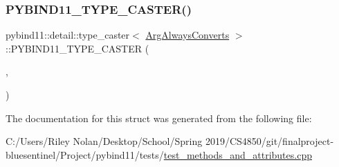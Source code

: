 \subsubsection{\texorpdfstring{PYBIND11\_TYPE\_CASTER()}{PYBIND11\_TYPE\_CASTER()}}
{\footnotesize\ttfamily pybind11\+::detail\+::type\+\_\+caster$<$ \mbox{\hyperlink{class_arg_always_converts}{Arg\+Always\+Converts}} $>$\+::P\+Y\+B\+I\+N\+D11\+\_\+\+T\+Y\+P\+E\+\_\+\+C\+A\+S\+T\+ER (\begin{DoxyParamCaption}\item[{\mbox{\hyperlink{class_arg_always_converts}{Arg\+Always\+Converts}}}]{,  }\item[{\mbox{\hyperlink{descr_8h_af114703e20c6527e87163eb2798f74b8}{\+\_\+}}(\char`\"{}Arg\+Always\+Converts\char`\"{})}]{ }\end{DoxyParamCaption})}



The documentation for this struct was generated from the following file\+:\begin{DoxyCompactItemize}
\item 
C\+:/\+Users/\+Riley Nolan/\+Desktop/\+School/\+Spring 2019/\+C\+S4850/git/finalproject-\/bluesentinel/\+Project/pybind11/tests/\mbox{\hyperlink{test__methods__and__attributes_8cpp}{test\+\_\+methods\+\_\+and\+\_\+attributes.\+cpp}}\end{DoxyCompactItemize}
